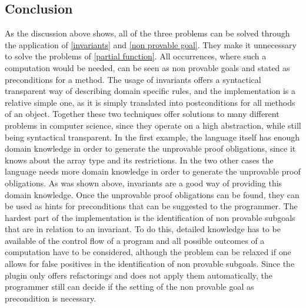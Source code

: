 \subsection{Conclusion}
As the discussion above shows, all of the three problems can be solved through the application of \ref{invariants} and \ref{non provable goal}. They make it unnecessary to solve the problems of \ref{partial function}. All occurrences, where such a computation would be needed, can be seen as non provable goals and stated as preconditions for a method. The usage of invariants offers a syntactical transparent way of describing domain specific rules, and the implementation is a relative simple one, as it is simply translated into postconditions for all methods of an object. Together these two techniques offer solutions to many different problems in computer science, since they operate on a high abstraction, while still being syntactical transparent.\newline 
In the first example, the language itself has enough domain knowledge in order to generate the unprovable proof obligations, since it knows about the array type and its restrictions. In the two other cases the language  needs more domain knowledge in order to generate the unprovable proof obligations. As was shown above, invariants are a good way of providing this domain knowledge.
Once the unprovable proof obligations can be found, they can be used as hints for preconditions that can be suggested to the programmer.\newline
The hardest part of the implementation is the identification of non provable subgoals that are in relation to an invariant. To do this, detailed knowledge has to be available of the control flow of a program and all possible outcomes of a computation have to be considered, although the problem can be relaxed if one allows for false positives in the identification of non provable subgoals. Since the plugin only offers refactorings and does not apply them automatically, the programmer still can decide if the setting of the non provable goal as precondition is necessary.  
